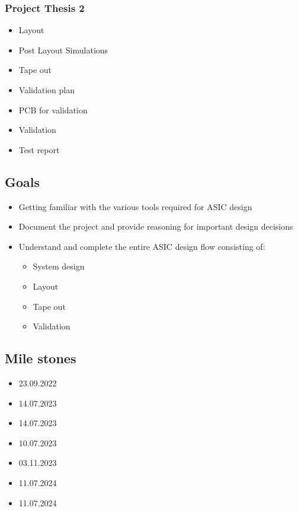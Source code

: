 \subsubsection{Project Thesis 2}
\begin{itemize}
	\item Layout
	\item Post Layout Simulations
	\item Tape out
	\item Validation plan
	\item PCB for validation
	\item Validation
	\item Test report
\end{itemize}
\subsection{Goals}
\begin{itemize}
	\item Getting familiar with the various tools required for \ac{ASIC} design
	\item Document the project and provide reasoning for important design decisions
	\item Understand and complete the entire \ac{ASIC} design flow consisting of:
	\begin{itemize}
		\item System design
		\item Layout
		\item Tape out
		\item Validation
	\end{itemize}
\end{itemize}
\subsection{Mile stones}
\begin{itemize}
	\item {23.09.2022}
	\item {14.07.2023}
	\item {14.07.2023}
	\item {10.07.2023}
	\item {03.11.2023}
	\item {11.07.2024}
	\item {11.07.2024}
\end{itemize}
